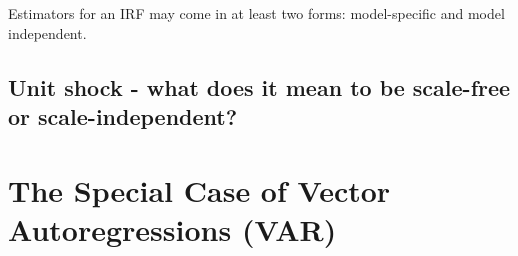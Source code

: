 \documentclass[11pt]{article}
\theoremstyle{definition}
\begin{document}
Estimators for an IRF may come in at least two forms: model-specific and model independent.

\subsection{Unit shock - what does it mean to be scale-free or scale-independent?}


\section{The Special Case of Vector Autoregressions (VAR)}







%

  
\end{document}
